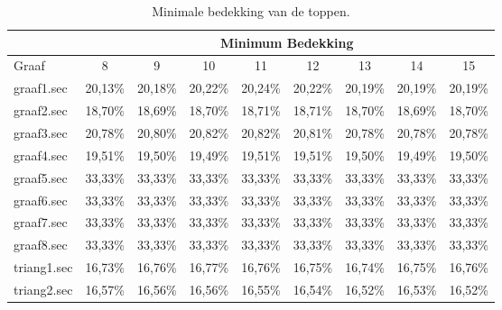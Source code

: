\documentclass[11pt, a4paper, table]{article}
\theoremstyle{definition}
\theoremstyle{definition}
\theoremstyle{definition}
\begin{document}
\begin{table}[tbp]
	\centering
	\begin{tabular}{|l|c|c|c|c|c|c|c|c|}
		\hline
		& \multicolumn{8}{c|}{Minimum Bedekking}		\\ \hline
		Graaf & 8  & 9  & 10  & 11  & 12  & 13  & 14  & 15 		\\ \hline
		graaf1.sec &  \cellcolor{LimeGreen}20,13\% & 20,18\% & 20,22\% & 20,24\% & 20,22\% & 20,19\% & 20,19\% & 20,19\%		\\ \hline
		graaf2.sec & 18,70\% &  \cellcolor{LimeGreen}18,69\% & 18,70\% & 18,71\% & 18,71\% & 18,70\% & 18,69\% & 18,70\%		\\ \hline
		graaf3.sec &  \cellcolor{LimeGreen}20,78\% & 20,80\% & 20,82\% & 20,82\% & 20,81\% & 20,78\% & 20,78\% & 20,78\%		\\ \hline
		graaf4.sec & 19,51\% & 19,50\% &  \cellcolor{LimeGreen}19,49\% & 19,51\% & 19,51\% & 19,50\% & 19,49\% & 19,50\%		\\ \hline
		graaf5.sec &  \cellcolor{LimeGreen}33,33\% & 33,33\% & 33,33\% & 33,33\% & 33,33\% & 33,33\% & 33,33\% & 33,33\%		\\ \hline
		graaf6.sec &  \cellcolor{LimeGreen}33,33\% & 33,33\% & 33,33\% & 33,33\% & 33,33\% & 33,33\% & 33,33\% & 33,33\%		\\ \hline
		graaf7.sec &  \cellcolor{LimeGreen}33,33\% & 33,33\% & 33,33\% & 33,33\% & 33,33\% & 33,33\% & 33,33\% & 33,33\%		\\ \hline
		graaf8.sec &  \cellcolor{LimeGreen}33,33\% & 33,33\% & 33,33\% & 33,33\% & 33,33\% & 33,33\% & 33,33\% & 33,33\%		\\ \hline
		triang1.sec &  \cellcolor{LimeGreen}16,73\% & 16,76\% & 16,77\% & 16,76\% & 16,75\% & 16,74\% & 16,75\% & 16,76\%		\\ \hline
		triang2.sec & 16,57\% & 16,56\% & 16,56\% & 16,55\% & 16,54\% & 16,52\% & 16,53\% &  \cellcolor{LimeGreen}16,52\%		\\ \hline
	\end{tabular}
	\caption{Minimale bedekking van de toppen.}
	\label{tabel:bedekking2}
\end{table}
\end{document}
